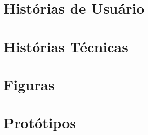 \begin{apendicesenv}
    \partapendices

    \chapter{Histórias de Usuário}
    \label{ch:historias_de_usuario}
    

    \chapter{Histórias Técnicas}
    \label{ch:historias_tecnicas}
    

    \chapter{Figuras}
    \label{ch:figuras}
    

    \chapter{Protótipos}
    \label{ch:prototipos}
    
    
\end{apendicesenv}